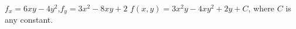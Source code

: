 {$f_x = 6xy-4y^2$,\quad $f_y = 3x^2-8xy+2$}
{$f(x,y) = 3x^2y-4xy^2+2y +C$, where $C$ is any constant.
}